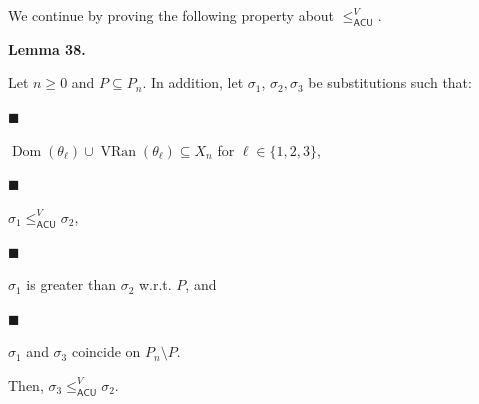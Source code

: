\documentclass[10pt,a4paper]{amsart}
\begin{document}
 
 
We continue by proving the following property about $\leq_{\mathsf{ACU}}^{V}$.\par
 
 
 
\par\medskip\noindent\textbf{Lemma 38.}\par
 
 
Let $n\geq 0$ and $P\subseteq P_{n}$. In addition, let $\sigma_{1}$, $\sigma_{2},\sigma_{3}$ be substitutions such that:\par
  
\par\noindent  $\blacksquare$ 
 
$\operatorname{Dom}(\theta_{\ell})\cup\operatorname{VRan}(\theta_{\ell})%
\subseteq X_{n}$ for $\ell\in\{1,2,3\}$,\par
 
 
 
\par\noindent  $\blacksquare$ 
 
$\sigma_{1}\leq_{\mathsf{ACU}}^{V}\sigma_{2}$,\par
 
 
 
\par\noindent  $\blacksquare$ 
 
$\sigma_{1}$ is greater than $\sigma_{2}$ w.r.t. $P$, and\par
 
 
 
\par\noindent  $\blacksquare$ 
 
$\sigma_{1}$ and $\sigma_{3}$ coincide on $P_{n}\setminus P$.\par
 
 
  
Then, $\sigma_{3}\leq_{\mathsf{ACU}}^{V}\sigma_{2}$.\par
 
 
 
 
\end{document}
